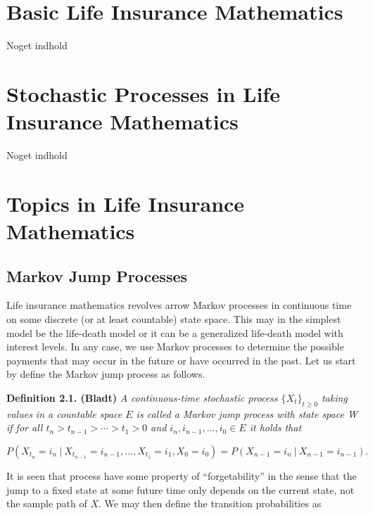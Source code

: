 \documentclass[
]{book}
\begin{document}
\hypertarget{basic-life-insurance-mathematics}{%
\chapter{Basic Life Insurance Mathematics}\label{basic-life-insurance-mathematics}}

Noget indhold

\hypertarget{stochastic-processes-in-life-insurance-mathematics}{%
\chapter{Stochastic Processes in Life Insurance Mathematics}\label{stochastic-processes-in-life-insurance-mathematics}}

Noget indhold

\hypertarget{topics-in-life-insurance-mathematics}{%
\chapter{Topics in Life Insurance Mathematics}\label{topics-in-life-insurance-mathematics}}

\hypertarget{markov-jump-processes}{%
\section{Markov Jump Processes}\label{markov-jump-processes}}

Life insurance mathematics revolves arrow Markov processes in continuous time on some discrete (or at least countable) state space. This may in the simplest model be the life-death model or it can be a generalized life-death model with interest levels. In any case, we use Markov processes to determine the possible payments that may occur in the future or have occurred in the past. Let us start by define the Markov jump process as follows.

\textbf{Definition 2.1. (Bladt)} \emph{A continuous-time stochastic process \(\{X_t\}_{t\ge 0}\) taking values in a countable space \(E\) is called a Markov jump process with state space W if for all \(t_n>t_{n-1}>\cdots > t_1>0\) and \(i_n,i_{n-1},...,i_0\in E\) it holds that}

\[
P(X_{t_n}=i_n \ \vert\ X_{t_{n-1}}=i_{n-1},...,X_{t_1}=i_1,X_0=i_0)=P(X_{n-1}=i_n\ \vert\ X_{n-1}=i_{n-1}).
\]

It is seen that process have some property of ``forgetability'' in the sense that the jump to a fixed state at some future time only depends on the current state, not the sample path of \(X\). We may then define the transition probabilities as
\end{document}
